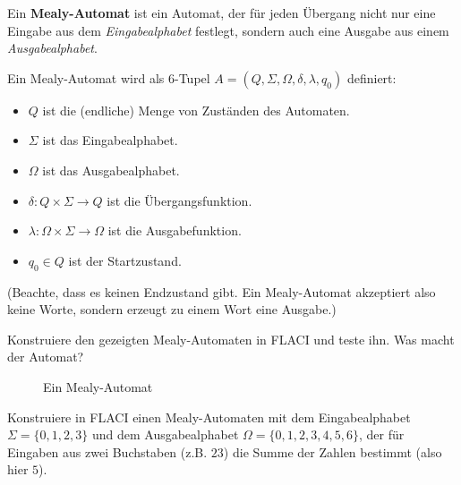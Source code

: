 \documentclass[fontsize=11pt, a4paper, ngerman]{scrartcl}
\begin{document}
\ReiheTitel

Ein \textbf{Mealy-Automat} ist ein Automat, der für jeden Übergang nicht nur eine Eingabe aus dem \emph{Eingabealphabet} festlegt, sondern auch eine Ausgabe aus einem \emph{Ausgabealphabet}.

Ein Mealy-Automat wird als 6-Tupel $A = (Q, \Sigma, \Omega, \delta, \lambda, q_0)$ definiert:
\begin{itemize}
	\item $Q$ ist die (endliche) Menge von Zuständen des Automaten.
	\item $\Sigma$ ist das Eingabealphabet.
	\item $\Omega$ ist das Ausgabealphabet.
	\item $\delta: Q\times \Sigma\rightarrow Q$ ist die Übergangsfunktion.
	\item $\lambda: \Omega\times \Sigma\rightarrow \Omega$ ist die Ausgabefunktion.
	\item $q_0\in Q$ ist der Startzustand.
\end{itemize}

(Beachte, dass es keinen Endzustand gibt. Ein Mealy-Automat akzeptiert also keine Worte, sondern erzeugt zu einem Wort eine Ausgabe.)

\begin{aufgabe}
	Konstruiere den gezeigten Mealy-Automaten in FLACI und teste ihn. Was macht der Automat?

	\begin{figure}[h]
	    \centering
	    \begin{transitiongraph}[fa]
	    \end{transitiongraph}
		\caption{Ein Mealy-Automat}
		\label{abb:mealy-graph}
	\end{figure}
\end{aufgabe}

\begin{aufgabe}
	Konstruiere in FLACI einen Mealy-Automaten mit dem Eingabealphabet $\Sigma = \{ 0, 1, 2, 3 \}$ und dem Ausgabealphabet $\Omega = \{ 0, 1, 2, 3, 4, 5, 6 \}$, der für Eingaben aus zwei Buchstaben (z.B. $23$) die Summe der Zahlen bestimmt (also hier $5$).

\end{aufgabe}
\end{document}
